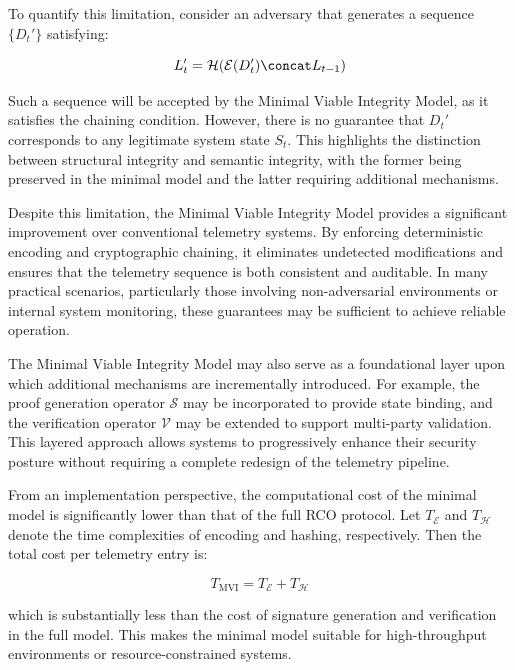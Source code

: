 To quantify this limitation, consider an adversary that generates a sequence $\{D_t'\}$ satisfying:

\begin{equation}
L_t' = \mathcal{H}(\mathcal{E}(D_t') \concat L_{t-1})
\end{equation}

Such a sequence will be accepted by the Minimal Viable Integrity Model, as it satisfies the chaining condition. However, there is no guarantee that $D_t'$ corresponds to any legitimate system state $S_t$. This highlights the distinction between structural integrity and semantic integrity, with the former being preserved in the minimal model and the latter requiring additional mechanisms.

Despite this limitation, the Minimal Viable Integrity Model provides a significant improvement over conventional telemetry systems. By enforcing deterministic encoding and cryptographic chaining, it eliminates undetected modifications and ensures that the telemetry sequence is both consistent and auditable. In many practical scenarios, particularly those involving non-adversarial environments or internal system monitoring, these guarantees may be sufficient to achieve reliable operation.

The Minimal Viable Integrity Model may also serve as a foundational layer upon which additional mechanisms are incrementally introduced. For example, the proof generation operator $\mathcal{S}$ may be incorporated to provide state binding, and the verification operator $\mathcal{V}$ may be extended to support multi-party validation. This layered approach allows systems to progressively enhance their security posture without requiring a complete redesign of the telemetry pipeline.

From an implementation perspective, the computational cost of the minimal model is significantly lower than that of the full RCO protocol. Let $T_{\mathcal{E}}$ and $T_{\mathcal{H}}$ denote the time complexities of encoding and hashing, respectively. Then the total cost per telemetry entry is:

\begin{equation}
T_{\text{MVI}} = T_{\mathcal{E}} + T_{\mathcal{H}}
\end{equation}

which is substantially less than the cost of signature generation and verification in the full model. This makes the minimal model suitable for high-throughput environments or resource-constrained systems.

